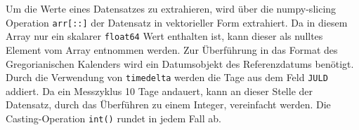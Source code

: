     Um die Werte eines Datensatzes zu extrahieren, wird über die numpy-slicing Operation \texttt{arr[::]} der Datensatz in vektorieller Form extrahiert. Da in diesem Array nur ein skalarer \texttt{float64} Wert enthalten ist, kann dieser als nulltes Element vom Array entnommen werden.
    Zur Überführung in das Format des Gregorianischen Kalenders wird ein Datumsobjekt des Referenzdatums benötigt. Durch die Verwendung von \texttt{timedelta} werden die Tage aus dem Feld \texttt{JULD} addiert. Da ein Messzyklus 10 Tage andauert, kann an dieser Stelle der Datensatz, durch das Überführen zu einem Integer, vereinfacht werden. Die Casting-Operation \texttt{int()} rundet in jedem Fall ab.
